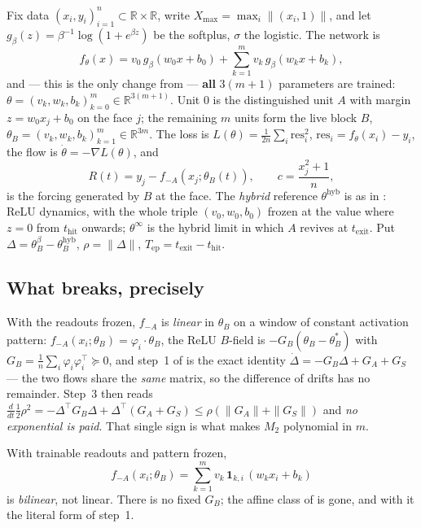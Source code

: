 \documentclass[11pt]{article}
\theoremstyle{remark}
\newcommand{\R}{\mathbb{R}}
\newcommand{\thit}{t_{\mathrm{hit}}}
\newcommand{\texit}{t_{\mathrm{exit}}}
\newcommand{\Tep}{T_{\mathrm{ep}}}
\newcommand{\hyb}{\mathrm{hyb}}
\newcommand{\res}{\mathrm{res}}
\newcommand{\Xmax}{X_{\max}}
\begin{document}
Fix data $(x_i,y_i)_{i=1}^n\subset\R\times\R$, write $\Xmax=\max_i\|(x_i,1)\|$,
and let $g_\beta(z)=\beta^{-1}\log(1+e^{\beta z})$ be the softplus, $\sigma$ the
logistic. The network is
\begin{equation}\label{eq:net}
f_\theta(x)=v_0\,g_\beta(w_0x+b_0)+\sum_{k=1}^{m}v_k\,g_\beta(w_kx+b_k),
\end{equation}
and --- this is the only change from \cite[Thm.~6]{paper} --- \textbf{all}
$3(m+1)$ parameters are trained:
$\theta=(v_k,w_k,b_k)_{k=0}^m\in\R^{3(m+1)}$. Unit $0$ is the distinguished
unit $A$ with margin $z=w_0x_j+b_0$ on the face $j$; the remaining $m$ units
form the live block $B$, $\theta_B=(v_k,w_k,b_k)_{k=1}^m\in\R^{3m}$. The loss
is $L(\theta)=\frac1{2n}\sum_i\res_i^2$, $\res_i=f_\theta(x_i)-y_i$, the flow is
$\dot\theta=-\nabla L(\theta)$, and
\[
R(t)=y_j-f_{-A}(x_j;\theta_B(t)),\qquad c=\frac{x_j^2+1}{n},
\]
is the forcing generated by $B$ at the face. The \emph{hybrid} reference
$\theta^{\hyb}$ is as in \cite[Def.~2]{paper}: ReLU dynamics, with the whole
triple $(v_0,w_0,b_0)$ frozen at the value where $z=0$ from $\thit$ onwards;
$\theta^\infty$ is the hybrid limit in which $A$ revives at $\texit$. Put
$\Delta=\theta_B^\beta-\theta_B^{\hyb}$, $\rho=\|\Delta\|$,
$\Tep=\texit-\thit$.

\subsection{What breaks, precisely}\label{sec:breaks}

With the readouts frozen, $f_{-A}$ is \emph{linear} in $\theta_B$ on a window of
constant activation pattern: $f_{-A}(x_i;\theta_B)=\varphi_i\cdot\theta_B$, the
ReLU $B$-field is $-G_B(\theta_B-\theta_B^\ast)$ with $G_B=\frac1n\sum_i
\varphi_i\varphi_i^\top\succeq0$, and step~1 of \cite[L2$'$]{paper} is the exact
identity $\dot\Delta=-G_B\Delta+G_A+G_S$ --- the two flows share the \emph{same}
matrix, so the difference of drifts has no remainder. Step~3 then reads
$\frac{d}{dt}\frac12\rho^2=-\Delta^\top G_B\Delta+\Delta^\top(G_A+G_S)
\le\rho(\|G_A\|+\|G_S\|)$ and \emph{no exponential is paid}. That single sign is
what makes $M_2$ polynomial in $m$.

With trainable readouts and pattern frozen,
\begin{equation}\label{eq:bilinear}
f_{-A}(x_i;\theta_B)=\sum_{k=1}^m v_k\,\mathbf1_{k,i}\,(w_kx_i+b_k)
\end{equation}
is \emph{bilinear}, not linear. There is no fixed $G_B$; the affine class of
\cite[\S3.1]{paper} is gone, and with it the literal form of step~1.
\end{document}
